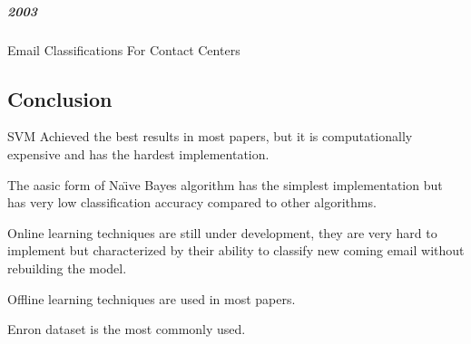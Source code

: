 \subparagraph{2003}
\begin{my_itemize}
  \item Email Classifications For Contact Centers \cite{ANI03}
\end{my_itemize}


\subsection{Conclusion}
\begin{my_itemize}
    \item SVM Achieved the best results in most papers, but it is computationally expensive and has the hardest implementation.
    \item The aasic form of Na\"{\i}ve Bayes algorithm has the simplest implementation but has very low classification accuracy compared to other algorithms.
    \item Online learning techniques are still under development, they are very hard to implement but characterized by their
    ability to classify new coming email without rebuilding the model.
    \item Offline learning techniques are used in most papers.
    \item Enron dataset is the most commonly used.
\end{my_itemize}
